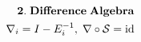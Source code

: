 \documentclass[preview]{standalone}
\begin{document}
\begin{align*}
\special{dvisvgm:raw <g id='unique000'>}\mathbf{2.\;Difference\;Algebra}\\\nabla_i = I - E_i^{-1},\;\nabla\circ\mathcal{S}=\operatorname{id}\special{dvisvgm:raw </g>}
\end{align*}
\end{document}
